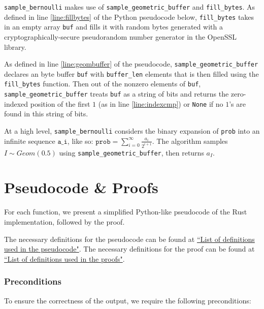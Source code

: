 \documentclass[11pt,a4paper]{article}
\newcommand{\vicki}[1]{{ {\color{olive}{(vicki)~#1}}}}
\theoremstyle{definition}
\begin{document}
\vicki{high-level walkthrough - should this be a separate section?} 
\texttt{sample\_bernoulli} makes use of \texttt{sample\_geometric\_buffer} and \texttt{fill\_bytes}. As defined in line \ref{line:fillbytes} of the Python pseudocode below, \texttt{fill\_bytes} takes in an empty array \texttt{buf} and fills it with random bytes generated with a cryptographically-secure pseudorandom number generator in the OpenSSL library. 

As defined in line \ref{line:geombuffer} of the pseudocode, \texttt{sample\_geometric\_buffer} declares an byte buffer \texttt{buf} with \texttt{buffer\_len} elements that is then filled using the \texttt{fill\_bytes} function. Then out of the nonzero elements of \texttt{buf}, \texttt{sample\_geometric\_buffer} treats \texttt{buf} as a string of bits and returns the zero-indexed position of the first $1$ (as in line \ref{line:indexcmp}) or \texttt{None} if no $1$'s are found in this string of bits. 

At a high level, \texttt{sample\_bernoulli} considers the binary expansion of \texttt{prob} into an infinite sequence $\texttt{a\_i}$, like so: $\texttt{prob} = \sum_{i = 0}^{\infty} \frac{a_i}{2^{i + 1}}$. The algorithm samples $I \sim Geom(0.5)$ using \texttt{sample\_geometric\_buffer}, then returns $a_I$. 

\section{Pseudocode \& Proofs}
For each function, we present a simplified Python-like pseudocode of the Rust implementation, followed by the proof. \vicki{later when we make this modular (i.e. sorted into functions relating to bernoulli, functions relating to geometric, etc.), each function will be a separate theorem.}

The necessary definitions for the pseudocode can be found at \href{https://github.com/opendp/whitepapers/blob/pseudocode-defns/pseudocode-defns/pseudocode_defns.pdf}{``List of definitions used in the pseudocode"}. The necessary definitions for the proof can be found at \href{https://github.com/opendp/whitepapers/blob/proof-defns/proof-defns/proof_defns.pdf}{``List of definitions used in the proofs"}. \vicki{need to fix these links} 

\subsubsection*{Preconditions}
To ensure the correctness of the output, we require the following preconditions:
\end{document}
